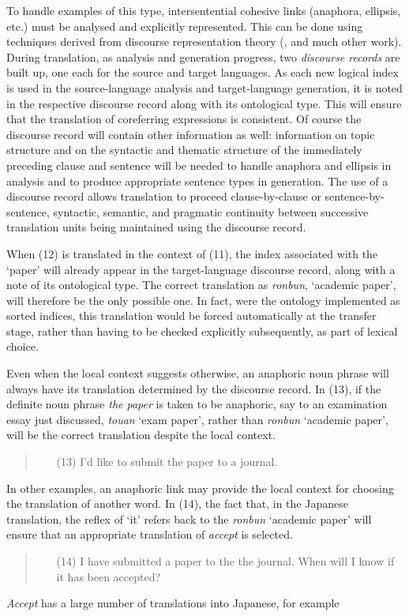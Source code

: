 To handle examples of this type, intersentential cohesive links
(anaphora, ellipsis, etc.) must be analysed and explicitly represented.
This can be done using techniques derived from discourse representation
theory (\cite{kamp:81:a}, \cite{asher:93:a} and much other work).
During translation, as analysis and generation progress, two
{\it discourse records\/} are built up, one each for the source and target
languages.
As each new logical index is used in the source-language analysis and
target-language generation, it is noted in the respective discourse
record along with its ontological type.
This will ensure that the translation of coreferring expressions is
consistent.
Of course the discourse record will contain other information as well:
information on topic structure and on the syntactic and thematic
structure of the immediately preceding clause and sentence will be
needed to handle anaphora and ellipsis in analysis and to produce
appropriate sentence types in generation.
The use of a discourse record allows translation to proceed
clause-by-clause or sentence-by-sentence, syntactic, semantic, and
pragmatic continuity between successive translation units being
maintained using the discourse record.

When (12) is translated in the context of (11), the index associated
with the `paper' will already appear in the target-language discourse
record, along with a note of its ontological type. The correct
translation as
{\it ronbun},
`academic paper', will therefore be the only possible one.
In fact, were the ontology implemented as sorted indices, this
translation would be forced automatically at the transfer stage, rather
than having to be checked explicitly subsequently, as part of lexical
choice.

Even when the local context suggests otherwise, an anaphoric noun phrase
will always have its translation determined by the discourse record.
In (13), if the definite noun phrase {\it the paper} is taken to be
anaphoric, say to an examination essay just discussed,
{\it touan\/}
`exam paper', rather than
{\it ronbun\/}
`academic paper', will be the correct translation despite the local
context.
\begin{quote}
  \begin{itemize}
  \item[(13)] I'd like to submit the paper to a journal.
  \end{itemize}
\end{quote}

In other examples, an anaphoric link may provide the local context for
choosing the translation of another word. In (14), the fact that, in the
Japanese translation, the reflex of `it' refers back to the
{\it ronbun\/}
`academic paper' will ensure that an appropriate translation of
{\it accept\/} is selected.
\begin{quote}
  \begin{itemize}
  \item[(14)] I have submitted a paper to the the journal.
    When will I know if it has been accepted?
  \end{itemize}
\end{quote}
{\it Accept\/} has a large number of translations into Japanese,
for example

